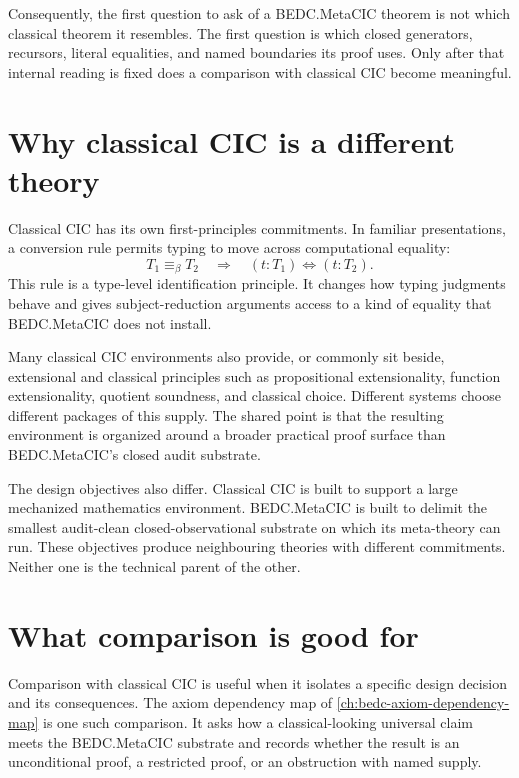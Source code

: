 Consequently, the first question to ask of a BEDC.MetaCIC theorem is not
which classical theorem it resembles. The first question is which closed
generators, recursors, literal equalities, and named boundaries its proof
uses. Only after that internal reading is fixed does a comparison with
classical CIC become meaningful.

\section{Why classical CIC is a different theory}
\label{sec:bedc-is-its-own-theory-classical-cic-different}

Classical CIC has its own first-principles commitments. In familiar
presentations, a conversion rule permits typing to move across
computational equality:
$$
T_1 \equiv_{\beta} T_2
\quad\Longrightarrow\quad
(t : T_1) \Leftrightarrow (t : T_2).
$$
This rule is a type-level identification principle. It changes how
typing judgments behave and gives subject-reduction arguments access to
a kind of equality that BEDC.MetaCIC does not install.

Many classical CIC environments also provide, or commonly sit beside,
extensional and classical principles such as propositional
extensionality, function extensionality, quotient soundness, and
classical choice. Different systems choose different packages of this
supply. The shared point is that the resulting environment is organized
around a broader practical proof surface than BEDC.MetaCIC's closed
audit substrate.

The design objectives also differ. Classical CIC is built to support a
large mechanized mathematics environment. BEDC.MetaCIC is built to
delimit the smallest audit-clean closed-observational substrate on which
its meta-theory can run. These objectives produce neighbouring theories
with different commitments. Neither one is the technical parent of the
other.

\section{What comparison is good for}
\label{sec:bedc-is-its-own-theory-comparison-good}

Comparison with classical CIC is useful when it isolates a specific
design decision and its consequences. The axiom dependency map of
\autoref{ch:bedc-axiom-dependency-map} is one such comparison. It asks
how a classical-looking universal claim meets the BEDC.MetaCIC
substrate and records whether the result is an unconditional proof, a
restricted proof, or an obstruction with named supply.

